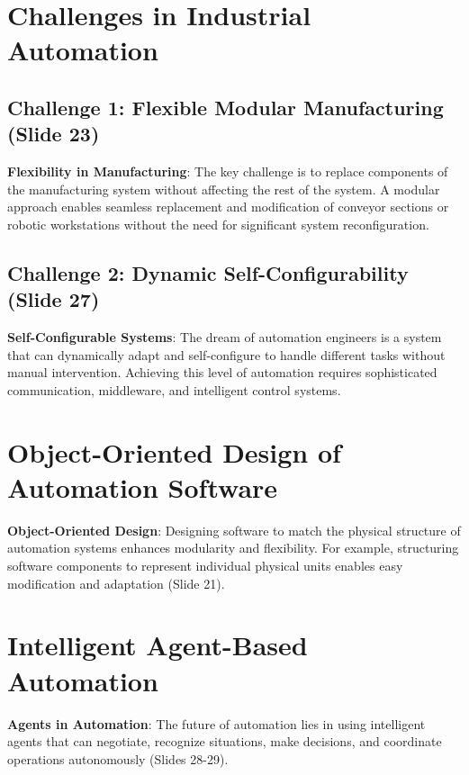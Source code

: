 \documentclass[
  14pt,
  a4paper,
  numbers=noendperiod,
  headinclude=true,
  footinclude=true,
  DIV=calc]{scrreprt}
\begin{document}
\section{Challenges in Industrial
Automation}\label{challenges-in-industrial-automation}

\subsection{Challenge 1: Flexible Modular Manufacturing (Slide
23)}\label{challenge-1-flexible-modular-manufacturing-slide-23}

\textbf{Flexibility in Manufacturing}: The key challenge is to replace
components of the manufacturing system without affecting the rest of the
system. A modular approach enables seamless replacement and modification
of conveyor sections or robotic workstations without the need for
significant system reconfiguration.

\subsection{Challenge 2: Dynamic Self-Configurability (Slide
27)}\label{challenge-2-dynamic-self-configurability-slide-27}

\textbf{Self-Configurable Systems}: The dream of automation engineers is
a system that can dynamically adapt and self-configure to handle
different tasks without manual intervention. Achieving this level of
automation requires sophisticated communication, middleware, and
intelligent control systems.

\section{Object-Oriented Design of Automation
Software}\label{object-oriented-design-of-automation-software}

\textbf{Object-Oriented Design}: Designing software to match the
physical structure of automation systems enhances modularity and
flexibility. For example, structuring software components to represent
individual physical units enables easy modification and adaptation
(Slide 21).

\section{Intelligent Agent-Based
Automation}\label{intelligent-agent-based-automation}

\textbf{Agents in Automation}: The future of automation lies in using
intelligent agents that can negotiate, recognize situations, make
decisions, and coordinate operations autonomously (Slides 28-29).
\end{document}
